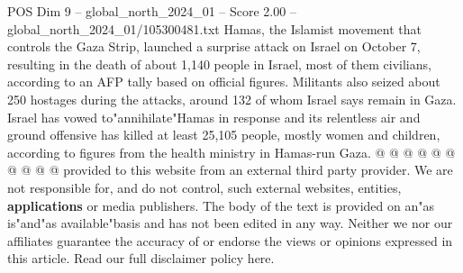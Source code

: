 \begin{textsample}{POS Dim 9 – global\_north\_2024\_01 – Score 2.00 – global\_north\_2024\_01/105300481.txt}
Hamas, the Islamist movement that controls the Gaza Strip, launched a surprise attack on Israel on October 7, resulting in the death of about 1,140 people in Israel, most of them civilians, according to an AFP tally based on official figures.
Militants also seized about 250 hostages during the attacks, around 132 of whom Israel says remain in Gaza.
Israel has vowed to"annihilate"Hamas in response and its relentless air and ground offensive has killed at least 25,105 people, mostly women and children, according to figures from the health ministry in Hamas-run Gaza. @ @ @ @ @ @ @ @ @ @ provided to this website from an external third party provider.
We are not responsible for, and do not control, such external websites, entities, \textbf{applications} or media publishers.
The body of the text is provided on an"as is"and"as available"basis and has not been edited in any way.
Neither we nor our affiliates guarantee the accuracy of or endorse the views or opinions expressed in this article.
Read our full disclaimer policy here.

\end{textsample}
